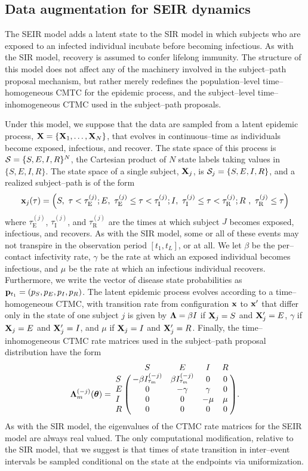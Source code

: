 \subsection{Data augmentation for SEIR dynamics}
\label{subsec:bda_seir_model}

The SEIR model adds a latent state to the SIR model in which subjects who are exposed to an infected individual incubate before becoming infectious. As with the SIR model, recovery is assumed to confer lifelong immunity. The structure of this model does not affect any of the machinery involved in the subject--path proposal mechanism, but rather merely redefines the population--level time--homogeneous CMTC for the epidemic process, and the subject--level time--inhomogeneous CTMC used in the subject--path proposals.

Under this model, we suppose that the data are sampled from a latent epidemic process, $ \mathbf{X} = \lbrace \mathbf{X}_1,\dots,\mathbf{X}_N\rbrace $, that evolves in continuous--time as individuals become exposed, infectious, and recover. The state space of this process is $ \mathcal{S} = \lbrace S,E,I,R\rbrace^N $, the Cartesian product of $ N $ state labels taking values in $ \lbrace S,E,I,R\rbrace $. The state space of a single subject, $ \mathbf{X}_j $, is $\mathcal{S}_j = \lbrace S, E, I, R\rbrace $, and a realized subject--path is of the form $$ \mathbf{x}_j(\tau) = \left (S,\ \tau < \tau^{(j)}_{\mathrm{E}};E,\  \tau^{(j)}_{\mathrm{E}} \leq \tau < \tau^{(j)}_{\mathrm{I}};I,\ \tau^{(j)}_{\mathrm{I}} \leq \tau < \tau^{(j)}_{\mathrm{R}};R\ ,\ \tau^{(j)}_{\mathrm{R}} \leq \tau
\right ) $$
where $ \tau^{(j)}_{\mathrm{E}} $, $ \tau^{(j)}_{\mathrm{I}} $, and $ \tau^{(j)}_{\mathrm{R}} $ are the times at which subject $ J $ becomes exposed, infectious, and recovers. As with the SIR model, some or all of these events may not transpire in the observation period $ [t_1,t_L] $, or at all. We let $ \beta $ be the per--contact infectivity rate, $ \gamma $ be the rate at which an exposed individual becomes infectious, and $ \mu $ be the rate at which an infectious individual recovers. Furthermore, we write the vector of disease state probabilities as $ \mathbf{p}_{t_1} = (p_S,p_E,p_I,p_R) $. The latent epidemic process evolves according to a time--homogeneous CTMC, with transition rate from configuration $ \mathbf{x} $ to $ \mathbf{x}^\prime $ that differ only in the state of one subject $ j $ is given by $ \boldsymbol{\Lambda} = \beta I $ if $ \mathbf{X}_j = S $ and $ \mathbf{X}^\prime_j = E$, $ \gamma $ if $ \mathbf{X}_j = E $ and $ \mathbf{X}^\prime_j = I$, and $ \mu $ if $ \mathbf{X}_j = I $ and $ \mathbf{X}^\prime_j = R$. Finally, the time--inhomogeneous CTMC rate matrices used in the subject--path proposal distribution have the form
\begin{equation} \bLambda_m^{(-j)}(\btheta) = \bordermatrix{ & S & E & I & R \cr
	S & -\beta I_{\tau_m}^{(-j)} & \beta I_{\tau_m}^{(-j)} & 0 & 0 \cr 
	E & 0 & -\gamma & \gamma & 0 \cr
	I & 0 & 0 & -\mu & \mu \cr
	R & 0 & 0 & 0 & 0 }.
\end{equation}
As with the SIR model, the eigenvalues of the CTMC rate matrices for the SEIR model are always real valued. The only computational modification, relative to the SIR model, that we suggest is that times of state transition in inter--event intervals be sampled conditional on the state at the endpoints via uniformization.

